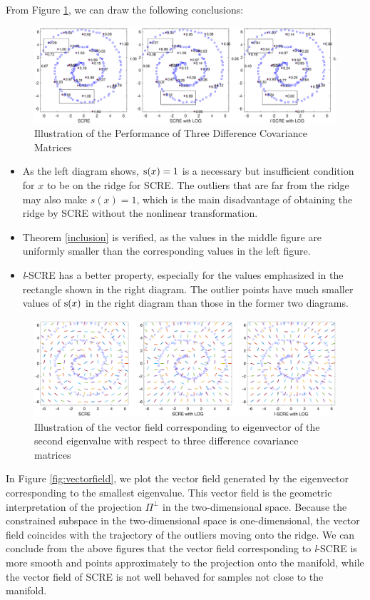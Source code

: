 \documentclass[aos,preprint]{imsart}
\theoremstyle{remark}
\begin{document}
 From Figure \ref{fig:Diff Covariance}, we can draw the following conclusions:
  \begin{figure}[h] %
    \includegraphics[width=\linewidth]{compare5n.eps} 
    \caption{Illustration of the Performance of Three Difference Covariance Matrices }
    \label{fig:Diff Covariance}
 \end{figure}
 \begin{itemize}
 \item As the left diagram shows, ${\rm s}(x)=1$ is a necessary but insufficient condition for $x$ to be on the ridge for SCRE. The outliers that are far from the ridge may also make $s(x)=1$, which is the main disadvantage of obtaining the ridge by SCRE without the nonlinear transformation. 
 \item Theorem \ref{inclusion} is verified, as the values in the middle figure are uniformly smaller than the corresponding values in the left figure.
\item {\it l}-SCRE has a better property, especially for the values emphasized in the rectangle shown in the right diagram. The outlier points have much smaller values of ${\rm s}(x)$ in the right diagram than those in the former two diagrams. 
 \end{itemize}
 
   \begin{figure}[h] %
    \includegraphics[width=\linewidth]{vectorfield2.eps} 
    \caption{Illustration of the vector field corresponding to eigenvector of the second eigenvalue with respect to three difference covariance matrices }
    \label{fig:vectorfield}
 \end{figure}
 In Figure \eqref{fig:vectorfield}, we plot the vector field generated by the eigenvector corresponding to the smallest eigenvalue. This vector field is the geometric interpretation of the projection $\Pi^{\perp}$ in the two-dimensional space. Because the constrained subspace in the two-dimensional space is one-dimensional, the vector field coincides with the trajectory of the outliers moving onto the ridge. We can conclude from the above figures that the vector field corresponding to {\it l}-SCRE is more smooth and points approximately to the projection onto the manifold, while the vector field of SCRE is not well behaved for samples not close to the manifold.
\end{document}
